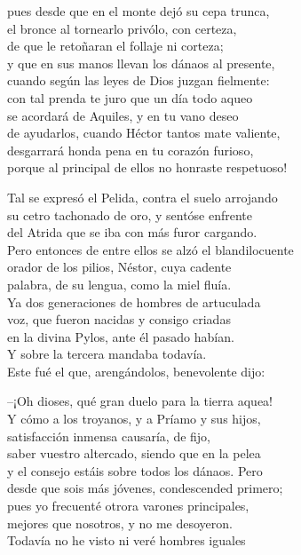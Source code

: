 \documentclass[11pt,twoside]{article}
\begin{document}
pues desde que en el monte dejó su cepa trunca,\\
el bronce al tornearlo privólo, con certeza,\\
de que le retoñaran el follaje ni corteza;\\
y que en sus manos llevan los dánaos al presente,\\
cuando según las leyes de Dios juzgan fielmente:\\
con tal prenda te juro que un día todo aqueo\\
se acordará de Aquiles, y en tu vano deseo\\
de ayudarlos, cuando Héctor tantos mate valiente,\\
desgarrará honda pena en tu corazón furioso,\\
porque al principal de ellos no honraste respetuoso!\par
Tal se expresó el Pelida, contra el suelo arrojando\\
su cetro tachonado de oro, y sentóse enfrente\\
del Atrida que se iba con más furor cargando.\\
Pero entonces de entre ellos se alzó el blandilocuente\\
orador de los pilios, Néstor, cuya cadente\\
palabra, de su lengua, como la miel fluía.\\
Ya dos generaciones de hombres de artuculada\\
voz, que fueron nacidas y consigo criadas\\
en la divina Pylos, ante él pasado habían.\\
Y sobre la tercera mandaba todavía.\\
Este fué el que, arengándolos, benevolente dijo:\par
--¡Oh dioses, qué gran duelo para la tierra aquea!\\
Y cómo a los troyanos, y a Príamo y sus hijos,\\
satisfacción inmensa causaría, de fijo,\\
saber vuestro altercado, siendo que en la pelea\\
y el consejo estáis sobre todos los dánaos. Pero\\
desde que sois más jóvenes, condescended primero;\\
pues yo frecuenté otrora varones principales,\\
mejores que nosotros, y no me desoyeron.\\
Todavía no he visto ni veré hombres iguales\\
\end{document}
